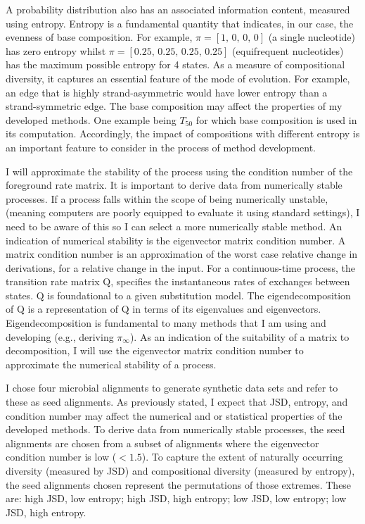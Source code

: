 A probability distribution also has an associated information content, measured using entropy. Entropy is a fundamental quantity that indicates, in our case, the evenness of base composition. For example, $\pi =[1,\, 0,\, 0,\, 0]$  (a single nucleotide) has zero entropy whilst  $\pi =[0.25,\, 0.25,\, 0.25,\, 0.25]$ (equifrequent nucleotides) has the maximum possible entropy for 4 states. As a measure of compositional diversity, it captures an essential feature of the mode of evolution. For example, an edge that is highly \gls{strand-asymmetric} would have lower entropy than a \gls{strand-symmetric} edge. The base composition may affect the properties of my developed methods. One example being $T_{50}$ for which base composition is used in its computation. Accordingly, the impact of compositions with different entropy is an important feature to consider in the process of method development.

I will approximate the stability of the process using the condition number of the foreground rate matrix. It is important to derive data from numerically stable processes. If a process falls within the scope of being numerically unstable, (meaning computers are poorly equipped to evaluate it using standard settings), I need to be aware of this so I can select a more numerically stable method. An indication of numerical stability is the eigenvector matrix condition number. A matrix condition number is an approximation of the worst case relative change in derivations, for a relative change in the input. For a continuous-time process, the transition rate matrix $\mathrm{Q}$, specifies the instantaneous rates of exchanges between states. $\mathrm{Q}$ is foundational to a given substitution model. The eigendecomposition of $\mathrm{Q}$ is a representation of $\mathrm{Q}$ in terms of its eigenvalues and eigenvectors. Eigendecomposition is fundamental to many methods that I am using and developing (e.g., deriving $\pi_{\infty}$). As an indication of the suitability of a matrix to decomposition, I will use the eigenvector matrix condition number to approximate the numerical stability of a process.

I chose four microbial alignments to generate synthetic data sets and refer to these as seed alignments. As previously stated, I expect that JSD, entropy, and condition number may affect the numerical and or statistical properties of the developed methods. To derive data from numerically stable processes, the seed alignments are chosen from a subset of alignments where the eigenvector condition number is low ($<1.5$). To capture the extent of naturally occurring diversity (measured by JSD) and compositional diversity (measured by entropy), the seed alignments chosen represent the permutations of those extremes. These are: high JSD, low entropy; high JSD, high entropy; low JSD, low entropy; low JSD, high entropy. 

